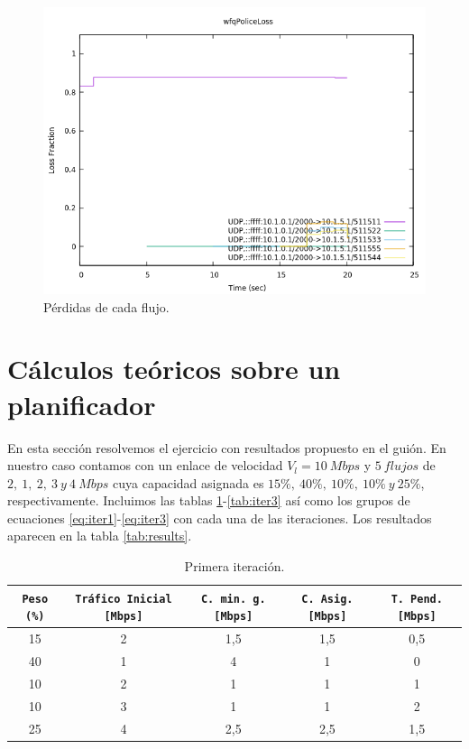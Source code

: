 \documentclass[11pt]{article}
\begin{document}
            \begin{figure}
                \centering
                \includegraphics[width=0.6\linewidth]{wfqPoliceLoss.png}
                \caption{Pérdidas de cada flujo.}
                \label{fig:wfqPoliceLoss}
            \end{figure}

    \section{Cálculos teóricos sobre un planificador}
        En esta sección resolvemos el ejercicio con resultados propuesto en el guión. En nuestro caso contamos con un enlace de velocidad $V_l = 10\ Mbps$ y $5\ flujos$ de $2,\ 1,\ 2,\ 3\ y\ 4\ Mbps$ cuya capacidad asignada es $15\%,\ 40\%,\ 10\%,\ 10\%\ y\ 25\%$, respectivamente. Incluimos las tablas \ref{tab:iter1}-\ref{tab:iter3} así como los grupos de ecuaciones \ref{eq:iter1}-\ref{eq:iter3} con cada una de las iteraciones. Los resultados aparecen en la tabla \ref{tab:results}.

        \begin{table}
            \centering
            \begin{tabular}{|c|c|c|c|c|}
                \hline
                \texttt{Peso (\%)} & \texttt{Tráfico Inicial [Mbps]} & \texttt{C. min. g. [Mbps]} & \texttt{C. Asig. [Mbps]} & \texttt{T. Pend. [Mbps]}\\
                \hline
                15 & 2 & 1,5 & 1,5 & 0,5\\
                \hline
                40 & 1 & 4 & 1 & 0\\
                \hline
                10 & 2 & 1 & 1 & 1\\
                \hline
                10 & 3 & 1 & 1 & 2\\
                \hline
                25 & 4 & 2,5 & 2,5 & 1,5\\
                \hline
            \end{tabular}
            \caption{Primera iteración.}
            \label{tab:iter1}
        \end{table}
\end{document}
